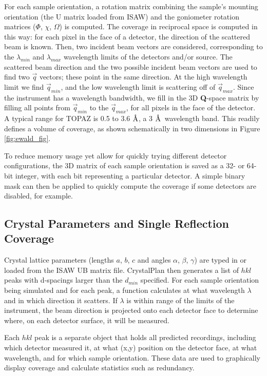 \documentclass[final]{iucr}              %
\newcommand{\ang}{$\mathrm{\AA} $}
\begin{document}
For each sample orientation, a rotation matrix combining the sample's mounting
orientation (the U matrix loaded from ISAW) and the goniometer rotation matrices
($\Phi$, $\chi$, $\Omega$) is computed. The coverage in reciprocal space is
computed in this way: for each pixel in the face of a detector, the direction of
the scattered beam is known. Then, two incident beam vectors are considered,
corresponding to the $\lambda_{min}$ and $\lambda_{max}$ wavelength limits
of the detectors and/or source. The scattered beam direction and the two possible incident beam vectors
are used to find two $\overrightarrow q$ vectors; these point in the
same direction. At the high wavelength limit we find $\overrightarrow q_{min}$,
and the low wavelength limit is scattering off of $\overrightarrow q_{max}$.
Since the instrument has a wavelength bandwidth, we fill in the 3D {\bf Q}-space
matrix by filling all points from $\overrightarrow q_{min}$ to the 
$\overrightarrow q_{max}$, for all pixels in the face of the detector.
A typical range for TOPAZ is 0.5 to 3.6 \ang, a 3 \ang\ wavelength band.
This readily defines a volume of coverage, as shown schematically in
two dimensions in Figure \ref{fig:ewald_fig}.


To reduce memory usage yet allow for quickly trying different detector
configurations, the 3D matrix of each sample orientation is saved as a 32- or
64-bit integer, with each bit representing a particular detector. A simple
binary mask can then be applied to quickly compute the coverage if some
detectors are disabled, for example.          




\subsection{Crystal Parameters and Single Reflection Coverage}

Crystal lattice parameters (lengths $a$, $b$, $c$ and angles $\alpha$, $\beta$,
$\gamma$) are typed in or loaded from the ISAW UB matrix file. CrystalPlan then
generates a list of $hkl$ peaks with d-spacings larger than the $d_{min}$
specified. For each sample orientation being simulated and for each peak, a function calculates at
what wavelength $\lambda$ and in which direction it scatters. If $\lambda$ 
is within range of the limits of the instrument, the beam direction is projected
onto each detector face to determine where, on each detector surface, it will be
measured. 
 
Each $hkl$ peak is a separate object that holds all predicted
recordings, including which detector measured it, at what (x,y) position on the
detector face, at what wavelength, and for which sample orientation. These data
are used to graphically display coverage and calculate statistics such as
redundancy. 
\end{document}
